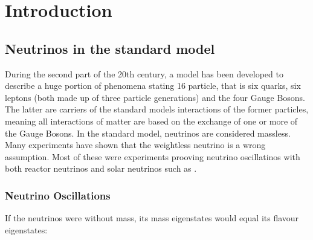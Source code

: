 
\chapter{Introduction}
\label{ch:Introduction}
    \section{Neutrinos in the standard model}
    \label{ch:Introduction:sec:Neutrinos in the standard model}
    During the second part of the 20th century, a model has been developed to describe a huge portion of phenomena stating 16 particle, that is six quarks, six leptons (both made up of three particle generations) and the four Gauge Bosons. The latter are carriers of the standard models interactions of the former particles, meaning all interactions of matter are based on the exchange of one or more of the Gauge Bosons. In the standard model, neutrinos are considered massless. 
    Many experiments have shown that the weightless neutrino is a wrong assumption. Most of these were experiments prooving neutrino oscillatinos with both reactor neutrinos and solar neutrinos such as .
    
    \subsection{Neutrino Oscillations}
    \label{ch:Introduction:sec:Massive neutrino:subsec:neutrino Oscillations}
      If the neutrinos were without mass, its mass eigenstates would equal its flavour eigenstates:
      
